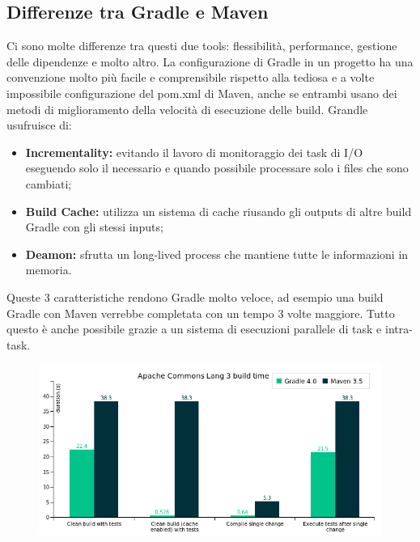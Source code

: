 \subsection{Differenze tra Gradle e Maven} %
Ci sono molte differenze tra questi due tools: flessibilità, performance, gestione delle dipendenze e molto altro. La configurazione di Gradle in un progetto ha una convenzione molto più facile e comprensibile rispetto alla tediosa e a volte impossibile configurazione del pom.xml di Maven, anche se entrambi usano dei metodi di miglioramento della velocità di esecuzione delle build. Grandle usufruisce di:
\begin{itemize}
    \item \textbf{Incrementality:} evitando il lavoro di monitoraggio dei task di I/O eseguendo solo il necessario e quando possibile processare solo i files che sono cambiati;
    \item \textbf{Build Cache:} utilizza un sistema di cache riusando gli outputs di altre build Gradle con gli stessi inputs;
    \item \textbf{Deamon:} sfrutta un long-lived process che mantiene tutte le informazioni in memoria.
\end{itemize}
Queste 3 caratteristiche rendono Gradle molto veloce, ad esempio una build Gradle con Maven verrebbe completata con un tempo 3 volte maggiore. Tutto questo è anche possibile grazie a un sistema di esecuzioni parallele di task e intra-task.
\begin{figure}[H]
\includegraphics[scale=0.70]{introduction/subsection/gradle/performance.png}
\end{figure} 
